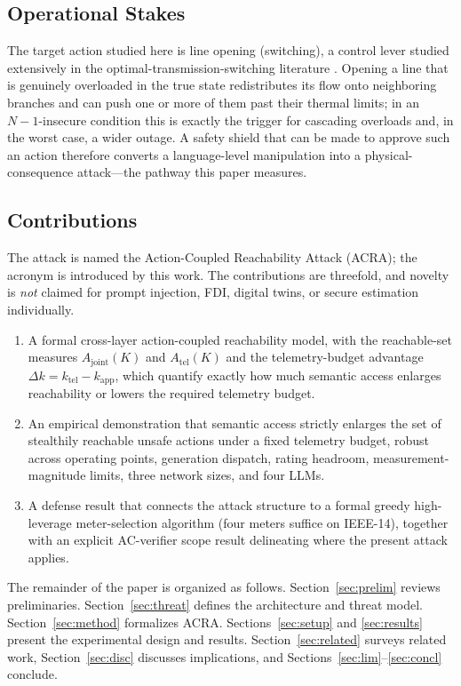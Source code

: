 \documentclass{ieeeaccess}
\begin{document}
\subsection{Operational Stakes}
The target action studied here is line opening (switching), a control lever studied extensively in the optimal-transmission-switching literature \cite{fisher,hedman}. Opening a line that is genuinely overloaded in the true state redistributes its flow onto neighboring branches and can push one or more of them past their thermal limits; in an $N{-}1$-insecure condition this is exactly the trigger for cascading overloads and, in the worst case, a wider outage. A safety shield that can be made to approve such an action therefore converts a language-level manipulation into a physical-consequence attack---the pathway this paper measures.

\subsection{Contributions}
The attack is named the Action-Coupled Reachability Attack (ACRA); the acronym is introduced by this work. The contributions are threefold, and novelty is \emph{not} claimed for prompt injection, FDI, digital twins, or secure estimation individually.
\begin{enumerate}
\item A formal cross-layer action-coupled reachability model, with the reachable-set measures $A_{\mathrm{joint}}(K)$ and $A_{\mathrm{tel}}(K)$ and the telemetry-budget advantage $\Delta k = k_{\mathrm{tel}}-k_{\mathrm{app}}$, which quantify exactly how much semantic access enlarges reachability or lowers the required telemetry budget.
\item An empirical demonstration that semantic access strictly enlarges the set of stealthily reachable unsafe actions under a fixed telemetry budget, robust across operating points, generation dispatch, rating headroom, measurement-magnitude limits, three network sizes, and four LLMs.
\item A defense result that connects the attack structure to a formal greedy high-leverage meter-selection algorithm (four meters suffice on IEEE-14), together with an explicit AC-verifier scope result delineating where the present attack applies.
\end{enumerate}
The remainder of the paper is organized as follows. Section~\ref{sec:prelim} reviews preliminaries. Section~\ref{sec:threat} defines the architecture and threat model. Section~\ref{sec:method} formalizes ACRA. Sections~\ref{sec:setup} and \ref{sec:results} present the experimental design and results. Section~\ref{sec:related} surveys related work, Section~\ref{sec:disc} discusses implications, and Sections~\ref{sec:lim}--\ref{sec:concl} conclude.
\end{document}
